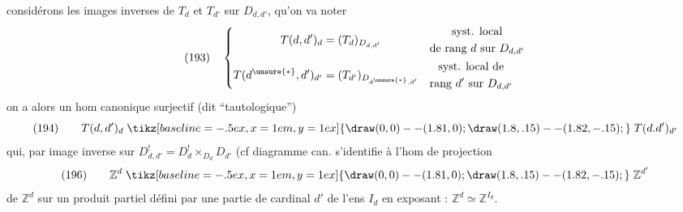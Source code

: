 considérons les images inverses de $T_d$ et $T_{d'}$ sur $D_{d,d'}$, qu'on va noter
\[
(193)\quad\left\{\begin{aligned}
T(d,d')_d&=(T_d)_{D_{d,d'}}&&\begin{gathered}\text{syst. local}\\\text{de rang }d\text{ sur }D_{d,d'}\end{gathered}\\
T(d^{\unsure{*}},d')_{d'}&=(T_{d'})_{D_{d^{\unsure{*}},d'}}&&\begin{gathered}\text{syst. local de}\\\text{rang }d'\text{ sur }D_{d,d'}\end{gathered}
\end{aligned}\right.
\]
on a alors un hom canonique surjectif (dit ``tautologique'')
\[
(194)\qquad T(d,d')_d\mathrel{\tikz[baseline=-.5ex,x=1em,y=1ex]{\draw (0,0)--(1.81,0);\draw (1.8,.15)--(1.82,-.15);}}T(d.d')_{d'}
\]
qui, par image inverse sur $D^!_{d,d'}=D^!_d\mathbin\times_{D_d}D_{d'}$ (cf diagramme can.
s'identifie à l'hom de projection
\[
(196)\qquad\mathbb Z^d\mathrel{\tikz[baseline=-.5ex,x=1em,y=1ex]{\draw (0,0)--(1.81,0);\draw (1.8,.15)--(1.82,-.15);}}\mathbb Z^{d'}
\]
de $\mathbb Z^d$ sur un produit partiel défini par une partie de cardinal $d'$ de l'ens $I_d$ en exposant : $\mathbb Z^d\simeq\mathbb Z^{I_d}$.
